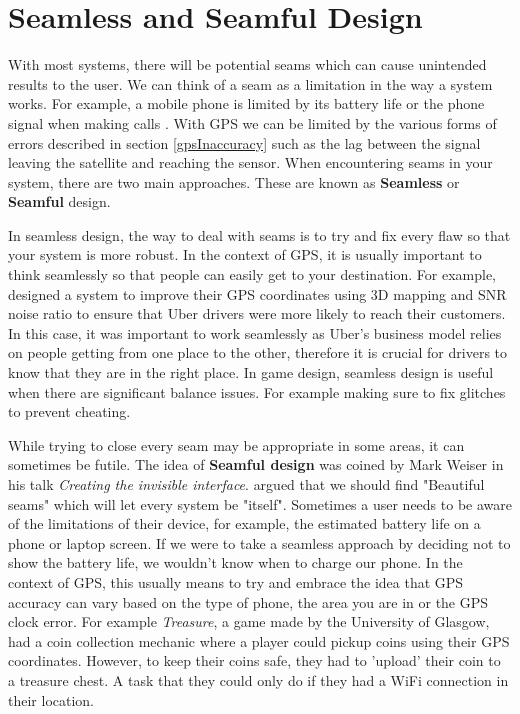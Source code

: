 \documentclass{l4proj}
\begin{document}
\section{Seamless and Seamful Design}
With most systems, there will be potential seams which can cause unintended results to the user. We can think of
a seam as a limitation in the way a system works. For example, a mobile phone is limited by its battery life or the phone
signal when making calls \citep{chalmers2003seamful}. With GPS we can be limited by the various forms of errors described in section \ref{gpsInaccuracy}
such as the lag between the signal leaving the satellite and reaching the sensor. When encountering seams in your system, there are two main
approaches. These are known as \textbf{Seamless} or \textbf{Seamful} design.

In seamless design, the way to deal with seams is to try and fix every flaw so that your system is more robust. In the context of GPS, it is usually important to think seamlessly
so that people can easily get to your destination. For example, \cite{uberGPS} designed a system to improve their
GPS coordinates using 3D mapping and SNR noise ratio to ensure that Uber drivers were more likely to reach their customers. In this
case, it was important to work seamlessly as Uber's business model relies on people getting from one place to the other, therefore it
is crucial for drivers to know that they are in the right place. In game design, seamless design is useful when there are significant balance issues. For example making sure to fix
glitches to prevent cheating. 

While trying to close every seam may be appropriate in some areas, it can sometimes be futile. The idea of
\textbf{Seamful design} was coined by Mark Weiser in his talk \emph{Creating the invisible interface}. \cite{weiser1994} argued
that we should find "Beautiful seams" which will let every system be "itself". Sometimes a user needs
to be aware of the limitations of their device, for example, the estimated battery life on a phone or laptop screen. If we were
to take a seamless approach by deciding not to show the battery life, we wouldn't know when to charge our phone. In the context of GPS, this usually means 
to try and embrace the idea that GPS accuracy can vary based on the type of phone, the area you are in or the GPS clock error. For example 
\emph{Treasure}, a game made by the University of Glasgow, had a coin collection mechanic where a player could pickup coins using their GPS 
coordinates. However, to keep their coins safe, they had to 'upload' their coin to a treasure chest. A
task that they could only do if they had a WiFi connection in their location. \citep{Barkhuus2005}
\end{document}
